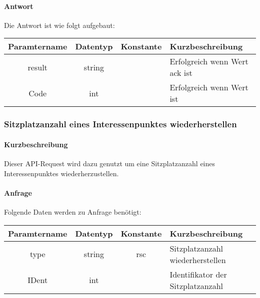 \paragraph{Antwort}Die Antwort ist wie folgt aufgebaut:
\begin{table}[H]
	\begin{tabular}{|c|c|c|p{6.5cm}|}
		\hline
		\textbf{Paramtername} & \textbf{Datentyp} & \textbf{Konstante} & \textbf{Kurzbeschreibung}                                                                                               \\ \hline
		result              & string           &                 & Erfolgreich wenn Wert {\glqq ack\grqq} ist \\ \hline
		Code                & int              &                 & Erfolgreich wenn Wert {\glqq 0\grqq} ist \\ \hline
	\end{tabular}
\end{table}
\subsubsection{Sitzplatzanzahl eines Interessenpunktes wiederherstellen}
\paragraph{Kurzbeschreibung}Dieser API-Request wird dazu genutzt um eine Sitzplatzanzahl eines Interessenpunktes wiederherzustellen.
\paragraph{Anfrage}Folgende Daten werden zu Anfrage benötigt:
\begin{table}[H]
	\begin{tabular}{|c|c|c|p{6.5cm}|}
		\hline
		\textbf{Paramtername} & \textbf{Datentyp} & \textbf{Konstante} & \textbf{Kurzbeschreibung}                                                                                               \\ \hline
		type                & string            & rsc                & Sitzplatzanzahl wiederherstellen \\ \hline
		IDent               & int               &                    & Identifikator der Sitzplatzanzahl \\ \hline
	\end{tabular}
\end{table}
